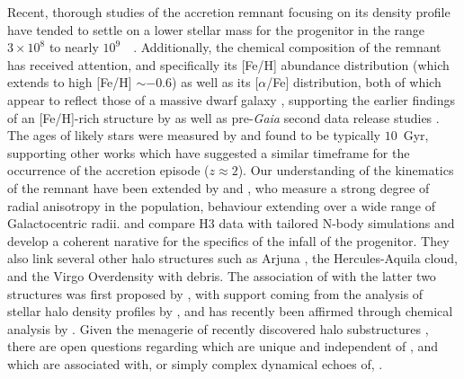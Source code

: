 Recent, thorough studies of the \gse accretion remnant focusing on its density profile have tended to settle on a lower stellar mass for the progenitor in the range $3\times10^{8}$ to nearly $10^{9}$~\Msun\ \parencite{mackereth19a,mackereth20,naidu21,han22}. Additionally, the chemical composition of the remnant has received attention, and specifically its [Fe/H] abundance distribution (which extends to high [Fe/H] $\sim -0.6$) as well as its [$\alpha$/Fe] distribution, both of which appear to reflect those of a massive dwarf galaxy \parencite{myeong19,monty20,mackereth19a,feuillet20,matsuno21,hasselquist21,buder22,gaiadr3_chemodynamics,horta23a}, supporting the earlier findings of an [Fe/H]-rich structure by \textcite{belokurov18} as well as pre-\textit{Gaia} second data release studies \parencite{nissen10,bonaca17,hayes18}. The ages of likely \gse stars were measured by \textcite{montalban21} and found to be typically $10$~Gyr, supporting other works which have suggested a similar timeframe for the occurrence of the accretion episode ($z\approx2$). Our understanding of the kinematics of the remnant have been extended by \textcite{lancaster19} and \textcite{iorio21}, who measure a strong degree of radial anisotropy in the population, behaviour extending over a wide range of Galactocentric radii. \textcite{naidu21} and \textcite{chandra23} compare H3 data with tailored N-body simulations and develop a coherent narative for the specifics of the infall of the progenitor. They also link several other halo structures such as Arjuna \parencite{naidu20}, the Hercules-Aquila cloud, and the Virgo Overdensity with \gse debris. The association of \gse with the latter two structures was first proposed by \textcite{simion19}, with support coming from the analysis of stellar halo density profiles by \textcite{iorio19}, and has recently been affirmed through chemical analysis by \textcite{perottoni22}. Given the menagerie of recently discovered halo substructures \parencite[see ][ for censuses of the major ones]{helmi20,naidu21,horta23a}, there are open questions regarding which are unique and independent of \gse, and which are associated with, or simply complex dynamical echoes of, \gse. 

